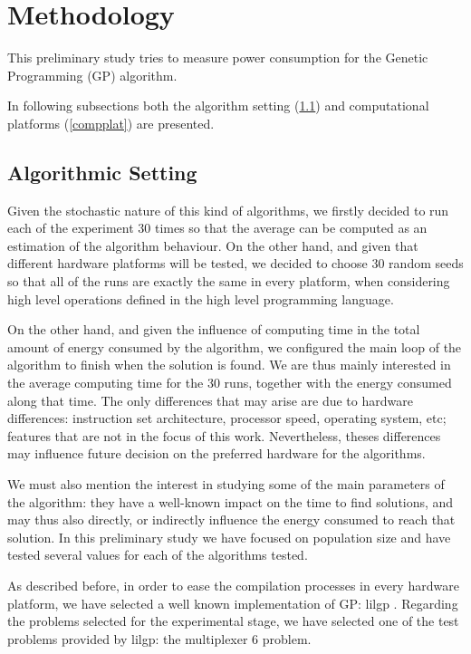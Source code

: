 \section{Methodology}
\label{methodology}

This preliminary study tries to measure power consumption for 
the Genetic Programming (GP) algorithm.

In following subsections both the algorithm setting (\ref{algsetting}) and computational platforms (\ref{compplat}) are presented.

\subsection{Algorithmic Setting}
\label{algsetting}

Given the stochastic nature of this kind of algorithms, we firstly decided to run each of the experiment 30 times so that the average can be computed as an estimation of the algorithm behaviour.  On the other hand, and given that different hardware platforms will be tested, we decided to choose 30 random seeds so that all of the runs are exactly the same in every platform, when considering high level operations defined in the high level programming language.

On the other hand, and given the influence of computing time in the total amount of energy consumed by the algorithm, we configured the main loop of the algorithm to finish when 
the solution is found.  We are thus mainly interested in the average computing time for the 30 runs, together with the energy consumed along that time.  The only differences that may arise are due to hardware differences:  instruction set architecture, processor speed, operating system, etc;  %
features that are not in the focus of this work.  Nevertheless, theses differences may influence future decision on the preferred hardware for the algorithms.  

We must also mention the interest in studying some of the main parameters of the algorithm:  they have a well-known impact on the time to find solutions, and may thus also directly, or indirectly influence the energy consumed to reach that solution.  In this preliminary study we have focused on population size and have tested several values for each of the algorithms tested.

As described before, in order to ease the compilation processes in every hardware platform, we have selected a well known implementation of GP:  lilgp \cite{lilgp}.
Regarding the problems selected for the experimental stage, we have selected one of the test problems provided by lilgp: the multiplexer 6 problem.

